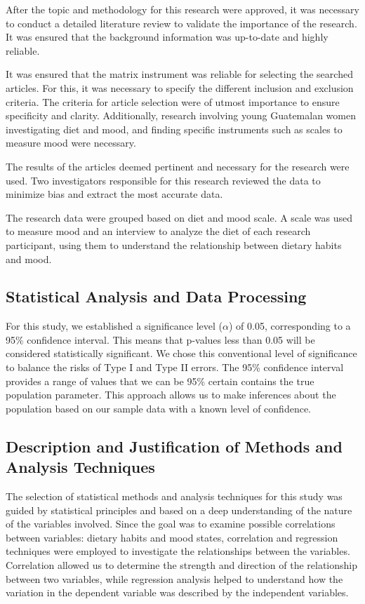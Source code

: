 \documentclass[jou]{apa7}
\begin{document}
After the topic and methodology for this research were approved, it was necessary to conduct a detailed literature review to validate the importance of the research. It was ensured that the background information was up-to-date and highly reliable.

It was ensured that the matrix instrument was reliable for selecting the searched articles. For this, it was necessary to specify the different inclusion and exclusion criteria. The criteria for article selection were of utmost importance to ensure specificity and clarity. Additionally, research involving young Guatemalan women investigating diet and mood, and finding specific instruments such as scales to measure mood were necessary.

The results of the articles deemed pertinent and necessary for the research were used. Two investigators responsible for this research reviewed the data to minimize bias and extract the most accurate data.

The research data were grouped based on diet and mood scale. A scale was used to measure mood and an interview to analyze the diet of each research participant, using them to understand the relationship between dietary habits and mood.


\subsection{Statistical Analysis and Data Processing}

For this study, we established a significance level ($\alpha$) of 0.05, corresponding to a 95\% confidence interval. This means that p-values less than 0.05 will be considered statistically significant. We chose this conventional level of significance to balance the risks of Type I and Type II errors. The 95\% confidence interval provides a range of values that we can be 95\% certain contains the true population parameter. This approach allows us to make inferences about the population based on our sample data with a known level of confidence.


\subsection{Description and Justification of Methods and Analysis Techniques}\label{descripciuxf3n-y-justificaciuxf3n-de-muxe9todos-y-tuxe9cnicas-de-anuxe1lisis}

The selection of statistical methods and analysis techniques for this study was guided by statistical principles and based on a deep understanding of the nature of the variables involved. Since the goal was to examine possible correlations between variables: dietary habits and mood states, correlation and regression techniques were employed to investigate the relationships between the variables. Correlation allowed us to determine the strength and direction of the relationship between two variables, while regression analysis helped to understand how the variation in the dependent variable was described by the independent variables.\\
\end{document}

